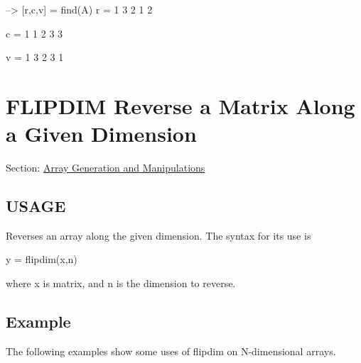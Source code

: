 \begin{DoxyVerbInclude}
--> [r,c,v] = find(A)
r = 
 1 
 3 
 2 
 1 
 2 

c = 
 1 
 1 
 2 
 3 
 3 

v = 
 1 
 3 
 2 
 3 
 1 
\end{DoxyVerbInclude}
 \hypertarget{array_flipdim}{}\section{F\-L\-I\-P\-D\-I\-M Reverse a Matrix Along a Given Dimension}\label{array_flipdim}
Section\-: \hyperlink{sec_array}{Array Generation and Manipulations} \hypertarget{typecast_dec2bin_USAGE}{}\subsection{U\-S\-A\-G\-E}\label{typecast_dec2bin_USAGE}
Reverses an array along the given dimension. The syntax for its use is \begin{DoxyVerb}   y = flipdim(x,n)
\end{DoxyVerb}
 where {\ttfamily x} is matrix, and {\ttfamily n} is the dimension to reverse. \hypertarget{variables_struct_Example}{}\subsection{Example}\label{variables_struct_Example}
The following examples show some uses of {\ttfamily flipdim} on N-\/dimensional arrays.


